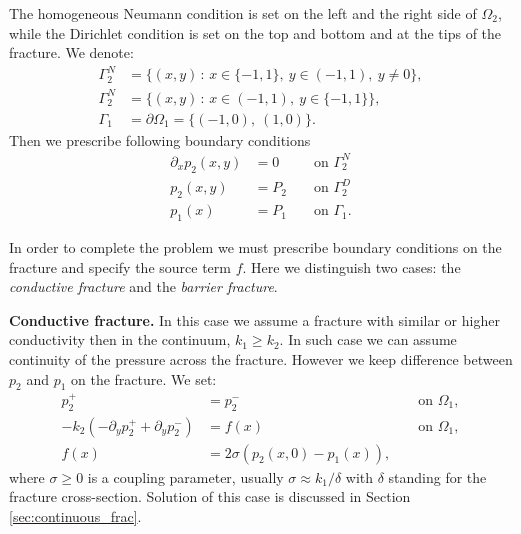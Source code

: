 \documentclass[a4paper,10pt]{article}
\def\prtl{\partial} %
\begin{document}
The homogeneous Neumann condition is set on the left and the right side of $\Omega_2$,
while the Dirichlet condition is set on the top and bottom and at the tips of the fracture.
We denote:
\begin{align*}
   \Gamma^N_2 &= \{(x,y)\, :\, x\in\{-1, 1\},\ y\in (-1, 1),\ y\ne 0\},\\
   \Gamma^N_2 &= \{(x,y)\, :\, x\in (-1, 1),\ y\in \{-1, 1\}\},\\
   \Gamma_1   &= \prtl \Omega_1 = \{(-1, 0),\ (1, 0)\}. 
\end{align*}
Then we prescribe following boundary conditions
\begin{align}
  \label{eq:bc_common}
  \prtl_x p_2(x,y) &= 0  &&\text{ on } \Gamma_2^N\\
  p_2(x,y) &= P_2        &&\text{ on } \Gamma_2^D\\
  p_1(x) &= P_1          &&\text{ on } \Gamma_1.
  \label{eq:bc_1}
\end{align}

In order to complete the problem we must prescribe boundary conditions on the fracture and specify the source term $f$. Here we 
distinguish two cases: the \emph{conductive fracture} and the \emph{barrier fracture}.


{\bf Conductive fracture.} In this case we assume a fracture with similar or higher conductivity then in the continuum, $k_1 \ge k_2$.
In such case we can assume continuity of the pressure across the fracture. However we keep difference between $p_2$ and $p_1$ on the fracture.
We set:
\begin{align}
  \label{eq:c_coupling_a}
  p_2^+ &= p_2^-                &&\text{ on }\Omega_1,\\
  -k_2 (-\prtl_y p_2^+ + \prtl_y p_2^-) &= f(x)         &&\text{ on }\Omega_1,\\
  f(x) &= 2\sigma (p_2(x,0) - p_1(x)),   &&
  \label{eq:c_coupling_c}
\end{align}
where $\sigma \ge 0$ is a coupling parameter, usually $\sigma \approx k_1 / \delta$ with $\delta$ standing for the fracture cross-section. 
Solution of this case is discussed in Section \ref{sec:continuous_frac}.
\end{document}
